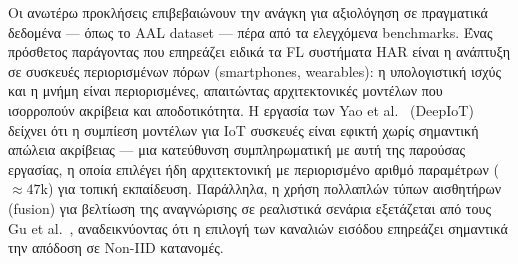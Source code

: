Οι ανωτέρω προκλήσεις επιβεβαιώνουν την ανάγκη για αξιολόγηση σε
πραγματικά δεδομένα — όπως το AAL dataset \cite{AAL_UCI2016}
— πέρα από τα ελεγχόμενα benchmarks. Ένας πρόσθετος παράγοντας
που επηρεάζει ειδικά τα FL συστήματα HAR είναι η ανάπτυξη σε
συσκευές περιορισμένων πόρων (smartphones, wearables): η υπολογιστική
ισχύς και η μνήμη είναι περιορισμένες, απαιτώντας αρχιτεκτονικές
μοντέλων που ισορροπούν ακρίβεια και αποδοτικότητα. Η εργασία των
Yao et al.\ \cite{Yao2017} (DeepIoT) δείχνει ότι η συμπίεση μοντέλων
για IoT συσκευές είναι εφικτή χωρίς σημαντική απώλεια ακρίβειας —
μια κατεύθυνση συμπληρωματική με αυτή της παρούσας εργασίας, η
οποία επιλέγει ήδη αρχιτεκτονική με περιορισμένο αριθμό παραμέτρων
($\approx 47$k) για τοπική εκπαίδευση. Παράλληλα, η χρήση πολλαπλών
τύπων αισθητήρων (fusion) για βελτίωση της αναγνώρισης σε ρεαλιστικά
σενάρια εξετάζεται από τους Gu et al.\ \cite{Gu2022}, αναδεικνύοντας
ότι η επιλογή των καναλιών εισόδου επηρεάζει σημαντικά την απόδοση
σε Non-IID κατανομές.
